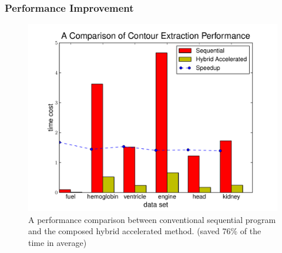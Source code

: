 \documentclass[8pt]{beamer}
\begin{document}


\begin{frame}
  \frametitle{Performance Improvement}
  \begin{figure}[H]
    \centering
    \includegraphics[width=.7\textwidth]{images/fig-perf-bar.pdf}
    \caption[Performance comparison with the original method]
    {A performance comparison between conventional sequential program and the 
      composed hybrid accelerated method. (saved \huge{76\%} \normalsize{of the time in average)}
    }
    \label{fig:_perf_bar}
  \end{figure}
  
\end{frame}
\note{}
\end{document}
